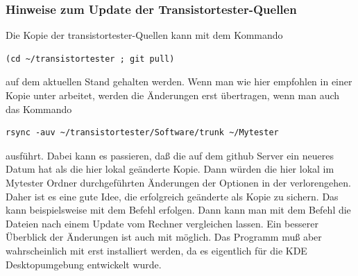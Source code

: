 \subsubsection{Hinweise zum Update der Transistortester-Quellen}
Die Kopie der transistortester-Quellen kann mit dem Kommando
\begin{large} \vspace{-0.4em} \begin{verbatim}
(cd ~/transistortester ; git pull)
\end{verbatim} \end{large}
auf dem aktuellen Stand gehalten werden.
Wenn man wie hier empfohlen in einer Kopie unter  arbeitet,
werden die Änderungen erst übertragen, wenn man auch das Kommando
\begin{large} \vspace{-0.4em} \begin{verbatim}
rsync -auv ~/transistortester/Software/trunk ~/Mytester
\end{verbatim} \end{large}
ausführt.
Dabei kann es passieren, daß die  auf dem github Server ein neueres Datum 
hat als die hier lokal geänderte Kopie. Dann würden die hier lokal im Mytester Ordner
durchgeführten Änderungen der Optionen in der  verlorengehen.
Daher ist es eine gute Idee, die erfolgreich geänderte  als Kopie
zu sichern. Das kann beispielsweise mit dem Befehl 
erfolgen. Dann kann man mit dem Befehl 
die Dateien nach einem Update vom Rechner vergleichen lassen.
Ein besserer Überblick der Änderungen ist auch mit 
möglich. Das Programm muß aber wahrscheinlich mit 
erst installiert werden, da es eigentlich für die KDE Desktopumgebung entwickelt wurde.

\newpage
